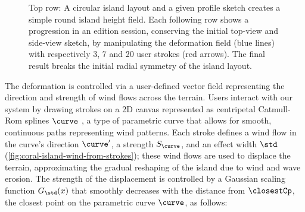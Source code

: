 \begin{figure} 
    \caption[Island deformation through strokes]{Top row: A circular island layout and a given profile sketch creates a simple round island height field. Each following row shows a progression in an edition session, conserving the initial top-view and side-view sketch, by manipulating the deformation field (blue lines) with respectively 3, 7 and 20 user strokes (red arrows). The final result breaks the initial radial symmetry of the island layout. }
    \label{fig:coral-island-wind-stroke-edition}
\end{figure}

The deformation is controlled via a user-defined vector field representing the direction and strength of wind flows across the terrain. Users interact with our system by drawing strokes on a 2D canvas represented as centripetal Catmull-Rom splines $\curve$ \cite{Catmull1974}, a type of parametric curve that allows for smooth, continuous paths representing wind patterns. Each stroke defines a wind flow in the curve's direction $\curve'$, a strength $S_\curve$, and an effect width $\std$ (\cref{fig:coral-island-wind-from-strokes}); these wind flows are used to displace the terrain, approximating the gradual reshaping of the island due to wind and wave erosion. The strength of the displacement is controlled by a Gaussian scaling function $G_\std(x)$ that smoothly decreases with the distance from $\closestCp$, the closest point on the parametric curve $\curve$, as follows:

